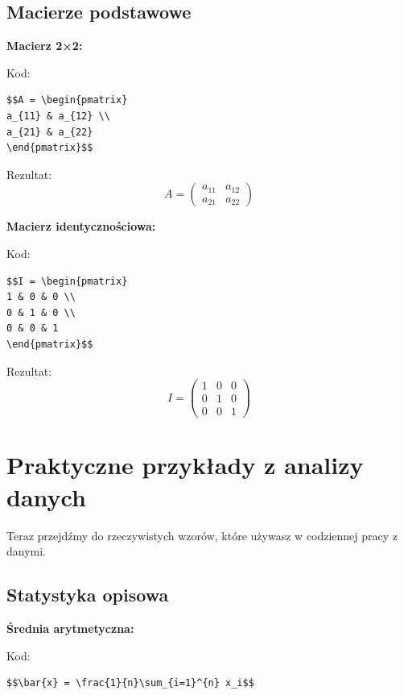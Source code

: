 \documentclass[
  polish,
  letterpaper,
  DIV=11,
  numbers=noendperiod]{scrreprt}
\begin{document}
\subsection{Macierze podstawowe}\label{macierze-podstawowe}

\textbf{Macierz 2×2:}

Kod:

\begin{verbatim}
$$A = \begin{pmatrix}
a_{11} & a_{12} \\
a_{21} & a_{22}
\end{pmatrix}$$
\end{verbatim}

Rezultat: \[A = \begin{pmatrix}
a_{11} & a_{12} \\
a_{21} & a_{22}
\end{pmatrix}\]

\textbf{Macierz identycznościowa:}

Kod:

\begin{verbatim}
$$I = \begin{pmatrix}
1 & 0 & 0 \\
0 & 1 & 0 \\
0 & 0 & 1
\end{pmatrix}$$
\end{verbatim}

Rezultat: \[I = \begin{pmatrix}
1 & 0 & 0 \\
0 & 1 & 0 \\
0 & 0 & 1
\end{pmatrix}\]

\section{Praktyczne przykłady z analizy
danych}\label{praktyczne-przykux142ady-z-analizy-danych}

Teraz przejdźmy do rzeczywistych wzorów, które używasz w codziennej
pracy z danymi.

\subsection{Statystyka opisowa}\label{statystyka-opisowa}

\textbf{Średnia arytmetyczna:}

Kod:

\begin{verbatim}
$$\bar{x} = \frac{1}{n}\sum_{i=1}^{n} x_i$$
\end{verbatim}
\end{document}
